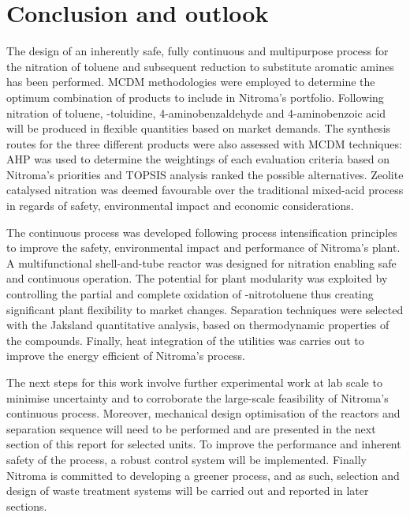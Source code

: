 \section{Conclusion and outlook}

The design of an inherently safe, fully continuous and multipurpose process for the nitration of toluene and subsequent reduction to substitute aromatic amines has been performed. MCDM methodologies were employed to determine the optimum combination of products to include in Nitroma's portfolio. Following nitration of toluene, \ortho-toluidine, 4-aminobenzaldehyde and 4-aminobenzoic acid will be produced in flexible quantities based on market demands. The synthesis routes for the three different products were also assessed with MCDM techniques: AHP was used to determine the weightings of each evaluation criteria based on Nitroma's priorities and TOPSIS analysis ranked the possible alternatives. Zeolite catalysed nitration was deemed favourable over the traditional mixed-acid process in regards of safety, environmental impact and economic considerations. 

The continuous process was developed following process intensification principles to improve the safety, environmental impact and performance of Nitroma's plant. A multifunctional shell-and-tube reactor was designed for nitration enabling safe and continuous operation. The potential for plant modularity was exploited by controlling the partial and complete oxidation of \para-nitrotoluene thus creating significant plant flexibility to market changes. Separation techniques were selected with the Jaksland quantitative analysis, based on thermodynamic properties of the compounds. Finally, heat integration of the utilities was carries out to improve the energy efficient of Nitroma's process.

The next steps for this work involve further experimental work at lab scale to minimise uncertainty and to corroborate the large-scale feasibility of Nitroma's continuous process. Moreover, mechanical design optimisation of the reactors and separation sequence will need to be performed and are presented in the next section of this report for selected units. To improve the performance and inherent safety of the process, a robust control system will be implemented. Finally Nitroma is committed to developing a greener process, and as such, selection and design of waste treatment systems will be carried out and reported in later sections.
